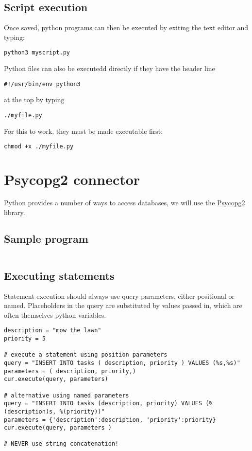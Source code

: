 \documentclass[slides]{pgnotes}
\begin{document}
\subsection{Script execution}

Once saved, python programs can then be executed by exiting the text editor and typing:

\begin{verbatim}
python3 myscript.py
\end{verbatim}

Python files can also be executedd directly if they have the header line
\begin{verbatim}
#!/usr/bin/env python3
\end{verbatim}
at the top by typing
\begin{verbatim}
./myfile.py
\end{verbatim}
For this to work, they must be made executable first:
\begin{verbatim}
chmod +x ./myfile.py
\end{verbatim}

\section{Psycopg2 connector}
\label{sec:psycopg2-connector}

Python provides a number of ways to access databases, we will use the
\href{https://www.psycopg.org}{Psycopg2} library.

\subsection{Sample program}

\inputminted{python}{connectivity_example.py}

\subsection{Executing statements}
\label{sec:executing-statements}

Statement execution should always use query parameters, either positional or named.
Placeholders in the query are substituted by values passed in, which are often themselves python variables.

\begin{verbatim}
description = "mow the lawn"
priority = 5

# execute a statement using position parameters
query = "INSERT INTO tasks ( description, priority ) VALUES (%s,%s)"
parameters = ( description, priority,) 
cur.execute(query, parameters)

# alternative using named parameters
query = "INSERT INTO tasks (description, priority) VALUES (%(description)s, %(priority))"
parameters = {'description':description, 'priority':priority}
cur.execute(query, parameters )

# NEVER use string concatenation!
\end{verbatim}
\end{document}
